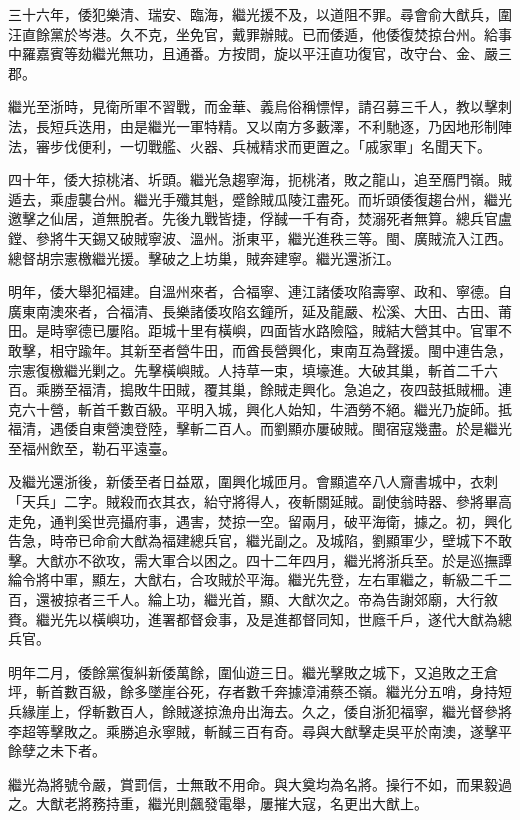\begin{pinyinscope}
三十六年，倭犯樂清、瑞安、臨海，繼光援不及，以道阻不罪。尋會俞大猷兵，圍汪直餘黨於岑港。久不克，坐免官，戴罪辦賊。已而倭遁，他倭復焚掠台州。給事中羅嘉賓等劾繼光無功，且通番。方按問，旋以平汪直功復官，改守台、金、嚴三郡。

繼光至浙時，見衛所軍不習戰，而金華、義烏俗稱慓悍，請召募三千人，教以擊刺法，長短兵迭用，由是繼光一軍特精。又以南方多藪澤，不利馳逐，乃因地形制陣法，審步伐便利，一切戰艦、火器、兵械精求而更置之。「戚家軍」名聞天下。

四十年，倭大掠桃渚、圻頭。繼光急趨寧海，扼桃渚，敗之龍山，追至鴈門嶺。賊遁去，乘虛襲台州。繼光手殲其魁，蹙餘賊瓜陵江盡死。而圻頭倭復趨台州，繼光邀擊之仙居，道無脫者。先後九戰皆捷，俘馘一千有奇，焚溺死者無算。總兵官盧鏜、參將牛天錫又破賊寧波、溫州。浙東平，繼光進秩三等。閩、廣賊流入江西。總督胡宗憲檄繼光援。擊破之上坊巢，賊奔建寧。繼光還浙江。

明年，倭大舉犯福建。自溫州來者，合福寧、連江諸倭攻陷壽寧、政和、寧德。自廣東南澳來者，合福清、長樂諸倭攻陷玄鐘所，延及龍嚴、松溪、大田、古田、莆田。是時寧德已屢陷。距城十里有橫嶼，四面皆水路險隘，賊結大營其中。官軍不敢擊，相守踰年。其新至者營牛田，而酋長營興化，東南互為聲援。閩中連告急，宗憲復檄繼光剿之。先擊橫嶼賊。人持草一束，填壕進。大破其巢，斬首二千六百。乘勝至福清，搗敗牛田賊，覆其巢，餘賊走興化。急追之，夜四鼓抵賊柵。連克六十營，斬首千數百級。平明入城，興化人始知，牛酒勞不絕。繼光乃旋師。抵福清，遇倭自東營澳登陸，擊斬二百人。而劉顯亦屢破賊。閩宿寇幾盡。於是繼光至福州飲至，勒石平遠臺。

及繼光還浙後，新倭至者日益眾，圍興化城匝月。會顯遣卒八人齎書城中，衣刺「天兵」二字。賊殺而衣其衣，紿守將得人，夜斬關延賊。副使翁時器、參將畢高走免，通判奚世亮攝府事，遇害，焚掠一空。留兩月，破平海衛，據之。初，興化告急，時帝已命俞大猷為福建總兵官，繼光副之。及城陷，劉顯軍少，壁城下不敢擊。大猷亦不欲攻，需大軍合以困之。四十二年四月，繼光將浙兵至。於是巡撫譚綸令將中軍，顯左，大猷右，合攻賊於平海。繼光先登，左右軍繼之，斬級二千二百，還被掠者三千人。綸上功，繼光首，顯、大猷次之。帝為告謝郊廟，大行敘賚。繼光先以橫嶼功，進署都督僉事，及是進都督同知，世廕千戶，遂代大猷為總兵官。

明年二月，倭餘黨復糾新倭萬餘，圍仙遊三日。繼光擊敗之城下，又追敗之王倉坪，斬首數百級，餘多墜崖谷死，存者數千奔據漳浦蔡丕嶺。繼光分五哨，身持短兵緣崖上，俘斬數百人，餘賊遂掠漁舟出海去。久之，倭自浙犯福寧，繼光督參將李超等擊敗之。乘勝追永寧賊，斬馘三百有奇。尋與大猷擊走吳平於南澳，遂擊平餘孽之未下者。

繼光為將號令嚴，賞罰信，士無敢不用命。與大奠均為名將。操行不如，而果毅過之。大猷老將務持重，繼光則飆發電舉，屢摧大寇，名更出大猷上。


\end{pinyinscope}
